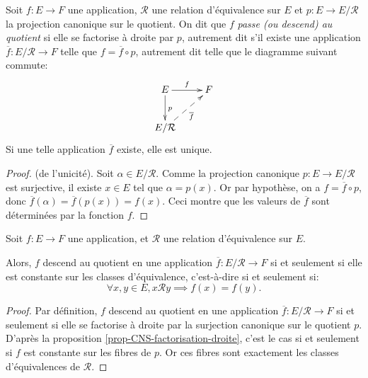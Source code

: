 \begin{propdef}
Soit $f : E\to F$ une application, $\mathcal R$ une relation d'équivalence sur $E$  et $p : E\to E/\mathcal R$ la projection canonique sur le quotient.
On dit que $f$ \emph{passe (ou descend) au quotient} si elle se factorise à droite par $p$, autrement dit s'il existe une application $\overline f : E/\mathcal R\to F$ telle que $f = \overline{f} \circ p$, autrement dit telle que le diagramme suivant commute:
\[
\xymatrix{
E \ar[r]^f \ar[d]^p & F\\
E/\mathcal R \ar@{-->}[ur]_{\overline f}& 
}
\] 
Si une telle application $\overline{f}$ existe, elle est unique.
\end{propdef}
\begin{proof}(de l'unicité). Soit $\alpha \in E/\mathcal R$. Comme la projection canonique $p : E\to E/\mathcal R$ est surjective, il existe $x\in E$ tel que $\alpha=p(x)$. Or par hypothèse, on a $f = \overline{f} \circ p$, donc $\overline f(\alpha) =\overline f(p(x))= f(x)$. Ceci montre que les valeurs de $\overline f$ sont déterminées par la fonction $f$.
\end{proof}


\begin{proposition}
Soit $f : E\to F$ une application, et $\mathcal R$ une relation d'équivalence sur $E$.

Alors, $f$ descend au quotient en une application $\overline f : E/\mathcal R \to F$ si et seulement si elle est constante sur les classes d'équivalence, c'est-à-dire si et seulement si:
\[
\forall x,y\in E, x\mathcal R y \implies f(x)=f(y).
\]
\end{proposition}

\begin{proof}
Par définition, $f$ descend au quotient en une application $\overline f : E/\mathcal R \to F$ si et seulement si elle se factorise à droite par la surjection canonique sur le quotient $p$.
D'après la proposition \ref{prop-CNS-factorisation-droite}, c'est le cas si et seulement si $f$ est constante sur les fibres de $p$.
Or ces fibres sont exactement les classes d'équivalences de $\mathcal R$.
\end{proof}











